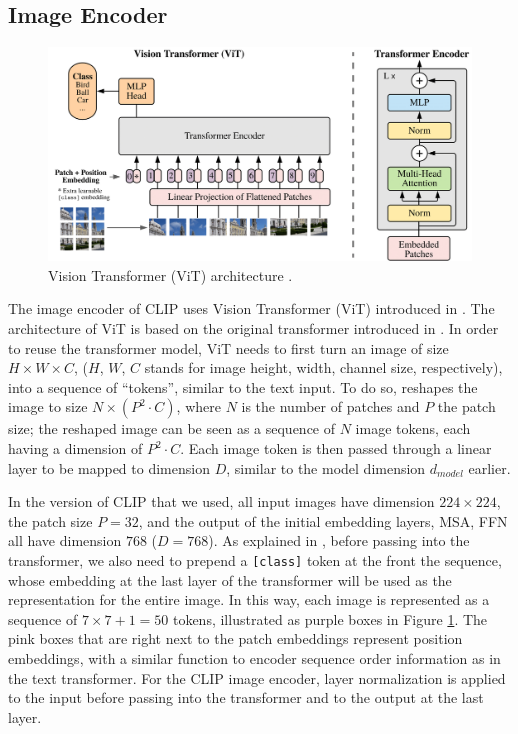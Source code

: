 \subsection{Image Encoder} \label{clip.image.encoder}
\begin{figure}[!htb]
\centering
\includegraphics[width=0.7\linewidth]{modeling/visionTransformer.png}  
\caption{Vision Transformer (ViT) architecture \citep{ViT}.}
\label{modeling.visionTransformer}
\end{figure}

The image encoder of CLIP uses Vision Transformer (ViT) introduced in \cite{ViT}. The architecture of ViT is based on the original transformer introduced in \cite{attentionAllYouNeed}. 
In order to reuse the transformer model, ViT needs to first turn an image of size $H\times W \times C$, ($H$, $W$, $C$ stands for image height, width, channel size, respectively), into a sequence of ``tokens'', similar to the text input.  
To do so, \cite{ViT} reshapes the image to size $N \times (P^2 \cdot C)$, where $N$ is the number of patches and $P$ the patch size; the reshaped image can be seen as a sequence of $N$ image tokens, each having a dimension of $P^2 \cdot C$. Each image token is then passed through a linear layer to be mapped to dimension $D$, similar to the model dimension $d_{model}$ earlier. 

In the version of CLIP that we used, all input images have dimension $224\times 224$, the patch size $P = 32$, and the output of the initial embedding layers, MSA, FFN all have dimension $768$ ($D = 768$). 
As explained in \cite{ViT}, before passing into the transformer, we also need to prepend a \texttt{[class]} token at the front the sequence, whose embedding at the last layer of the transformer will be used as the representation for the entire image. In this way, each image is represented as a sequence of $7\times 7 + 1 = 50$ tokens, illustrated as purple boxes in Figure \ref{modeling.visionTransformer}. The pink boxes that are right next to the patch embeddings represent position embeddings, with a similar function to encoder sequence order information as in the text transformer. 
For the CLIP image encoder, layer normalization is applied to the input before passing into the transformer and to the output at the last layer.
 

